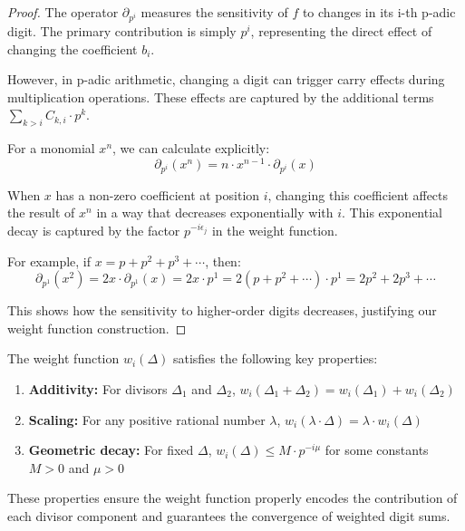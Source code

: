 \begin{proof}
The operator $\partial_{p^i}$ measures the sensitivity of $f$ to changes in its i-th p-adic digit. The primary contribution is simply $p^i$, representing the direct effect of changing the coefficient $b_i$.

However, in p-adic arithmetic, changing a digit can trigger carry effects during multiplication operations. These effects are captured by the additional terms $\sum_{k > i} C_{k,i} \cdot p^k$.

For a monomial $x^n$, we can calculate explicitly:
$$\partial_{p^i}(x^n) = n \cdot x^{n-1} \cdot \partial_{p^i}(x)$$

When $x$ has a non-zero coefficient at position $i$, changing this coefficient affects the result of $x^n$ in a way that decreases exponentially with $i$. This exponential decay is captured by the factor $p^{-i\epsilon_j}$ in the weight function.

For example, if $x = p + p^2 + p^3 + \cdots$, then:
$$\partial_{p^1}(x^2) = 2x \cdot \partial_{p^1}(x) = 2x \cdot p^1 = 2(p + p^2 + \cdots) \cdot p^1 = 2p^2 + 2p^3 + \cdots$$

This shows how the sensitivity to higher-order digits decreases, justifying our weight function construction.
\end{proof}

\begin{proposition}\label{prop:weight-divisor-relationship}
The weight function $w_i(\Delta)$ satisfies the following key properties:
\begin{enumerate}
    \item \textbf{Additivity:} For divisors $\Delta_1$ and $\Delta_2$, $w_i(\Delta_1 + \Delta_2) = w_i(\Delta_1) + w_i(\Delta_2)$
    \item \textbf{Scaling:} For any positive rational number $\lambda$, $w_i(\lambda \cdot \Delta) = \lambda \cdot w_i(\Delta)$
    \item \textbf{Geometric decay:} For fixed $\Delta$, $w_i(\Delta) \leq M \cdot p^{-i\mu}$ for some constants $M > 0$ and $\mu > 0$
\end{enumerate}
These properties ensure the weight function properly encodes the contribution of each divisor component and guarantees the convergence of weighted digit sums.
\end{proposition}

